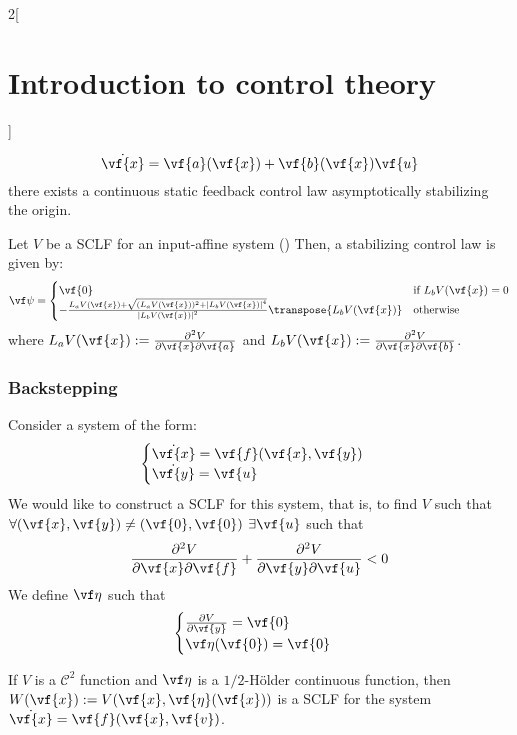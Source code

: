 \documentclass[../../../main_math.tex]{subfiles}
\begin{document}
\begin{multicols}{2}[\section{Introduction to control theory}]
\begin{theorem}
    \begin{equation}\label{ICT:inputaffine}
      \dot{\vf{x}} = \vf{a}(\vf{x}) + \vf{b}(\vf{x})\vf{u}
    \end{equation}
    there exists a continuous static feedback control law asymptotically stabilizing the origin.
  \end{theorem}
  \begin{theorem}
    Let $V$ be a SCLF for an input-affine system () Then, a stabilizing control law is given by:
    $$
      \vf\psi=\begin{cases}
        \vf{0}                                                                                                          & \text{if } L_bV(\vf{x})=0 \\
        -\frac{L_aV(\vf{x})+\sqrt{(L_aV(\vf{x}))^2+\abs{L_bV(\vf{x})}^4}}{\abs{L_bV(\vf{x})}^2}\transpose{L_bV(\vf{x})} & \text{otherwise}
      \end{cases}
    $$
    where $L_aV(\vf{x}):=\pdv{V}{\vf{x}}\vf{a}(\vf{x})$ and $L_bV(\vf{x}):=\pdv{V}{\vf{x}}\vf{b}(\vf{x})$.
  \end{theorem}
  \subsubsection{Backstepping}
  Consider a system of the form:
  \begin{equation}\label{ICT:backstepping}
    \begin{cases}
      \dot{\vf{x}} = \vf{f}(\vf{x}, \vf{y}) \\
      \dot{\vf{y}} = \vf{u}
    \end{cases}
  \end{equation}
  We would like to construct a SCLF for this system, that is, to find $V$ such that $\forall (\vf{x}, \vf{y})\ne (\vf{0}, \vf{0})$ $\exists \vf{u}$ such that $$
    \pdv{V}{\vf{x}}\vf{f}(\vf{x}, \vf{y}) + \pdv{V}{\vf{y}}\vf{u}<0
  $$
  We define $\vf\eta$ such that
  $$
    \begin{cases}
      \pdv{V}{\vf{y}}(\vf{x}, \vf{\eta}(x)) = \vf{0} \\
      \vf\eta(\vf{0}) = \vf{0}
    \end{cases}
  $$
  \begin{lemma}
    If $V$ is a $\mathcal{C}^2$ function and $\vf\eta$ is a $1/2$-Hölder continuous function, then $W(\vf{x}):=V(\vf{x}, \vf{\eta}(\vf{x}))$ is a SCLF for the system $\dot{\vf{x}} = \vf{f}(\vf{x}, \vf{v})$.
  \end{lemma}


\end{multicols}
\end{document}
